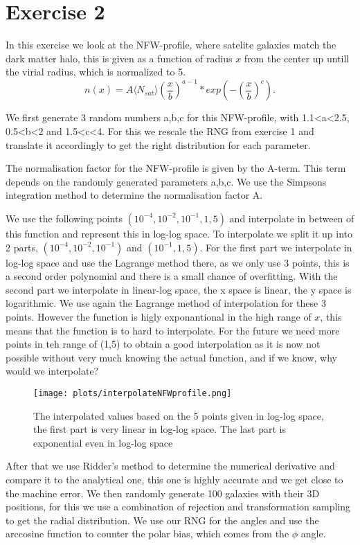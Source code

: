 \section{Exercise 2}
In this exercise we look at the NFW-profile, where satelite galaxies match the dark matter halo, this is given as a function of radius $x$ from the center up untill the virial radius, which is normalized to 5.
\begin{equation}
n(x)=A\langle N_{sat}\rangle \left(\frac{x}{b}\right)^{a-1}*exp\left(-(\frac{x}{b})^c\right).
\end{equation}

We first generate 3 random numbers a,b,c for this NFW-profile, with 1.1<a<2.5, 0.5<b<2 and 1.5<c<4. For this we rescale the RNG from exercise 1 and translate it accordingly to get the right distribution for each parameter.

The normalisation factor for the NFW-profile is given by the A-term. This term depends on the randomly generated parameters a,b,c.
We use the Simpsons integration method to determine the normalisation factor A. 

We use the following points $(10^{-4},10^{-2},10^{-1},1,5)$ and interpolate in between of this function and represent this in log-log space.
To interpolate we split it up into 2 parts, $(10^{-4},10^{-2},10^{-1})$ and $(10^{-1},1,5)$. For the first part we interpolate in log-log space and use the Lagrange method there, as we only use 3 points, this is a second order polynomial and there is a small chance of overfitting.
With the second part we interpolate in linear-log space, the x space is linear, the y space is logarithmic. We use again the Lagrange method of interpolation for these 3 points. However the function is higly exponantional in the high range of $x$, this means that the function is to hard to interpolate. For the future we need more points in teh range of (1,5) to obtain a good interpolation as it is now not possible without very much knowing the actual function, and if we know, why would we interpolate?
\begin{figure}[h]
   \centering
   \texttt{[image: plots/interpolateNFWprofile.png]}
      \caption{The interpolated values based on the 5 points given in log-log space, the first part is very linear in log-log space. The last part is exponential even in log-log space}
\end{figure}


After that we use Ridder's method to determine the numerical derivative and compare it to the analytical one, this one is highly accurate and we get close to the machine error.
We then randomly generate 100 galaxies with their 3D positions, for this we use a combination of rejection and transformation sampling to get the radial distribution. We use our RNG for the angles and use the arccosine function to counter the polar bias, which comes from the $\phi$ angle.

